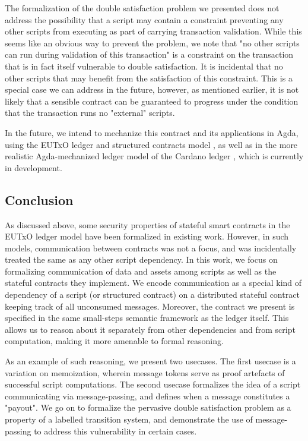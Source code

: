 The formalization of the double satisfaction problem we presented does not address
the possibility that a script may contain a constraint preventing any other
scripts from executing as part of carrying transaction validation. While this
seems like an obvious way to prevent the problem, we note that "no other
scripts can run during validation of this transaction" is a constraint
on the transaction that is in fact itself vulnerable to double satisfaction.
It is incidental that no other scripts that may benefit from the satisfaction of
this constraint.
This is a special case we can address in the future, however, as mentioned
earlier, it is not likely that a sensible contract can be guaranteed to progress
under the condition that the transaction runs no "external" scripts.

In the future, we intend to mechanize this contract and its applications in Agda,
using the EUTxO ledger and structured contracts model \cite{agda-structured},
as well as in the more realistic Agda-mechanized ledger model \cite{agdaspec} of
the Cardano ledger \cite{cardano}, which is currently in development.

\subsection{Conclusion}
\label{sec:conclusion}

As discussed above, some security properties of
stateful smart contracts in the EUTxO
ledger model have been formalized in existing work.
However, in such models, communication between contracts was not a focus, and was
incidentally treated the same as any other script dependency. In this work, we focus on
formalizing communication of data and assets among
scripts as well as the stateful contracts they implement. We encode communication
as a special kind of dependency of a script (or structured contract) on a distributed
stateful
contract keeping track of all unconsumed messages. Moreover, the contract
we present is specified in the
same small-steps semantic framework as the ledger itself. This allows us to reason about
it separately from other dependencies and from script computation, making it more
amenable to formal reasoning.

As an example of such reasoning, we present
two usecases. The first usecase is a variation on memoization,
wherein message tokens serve as proof
artefacts of successful script computations. The second usecase formalizes
the idea of a script communicating via message-passing, and defines when a message
constitutes a "payout". We go on to formalize the pervasive double satisfaction
problem as a property of a labelled transition system, and demonstrate
the use of message-passing to address this vulnerability in certain cases.



